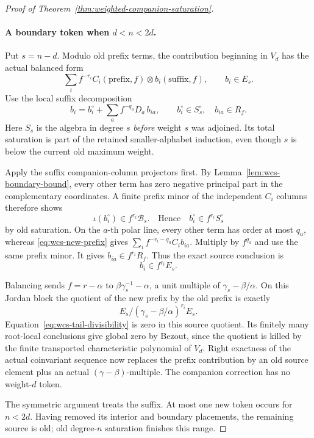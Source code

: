 \begin{proof}[Proof of Theorem~\ref{thm:weighted-companion-saturation}]
\paragraph{A boundary token when \(d<n<2d\).}
Put \(s=n-d\).  Modulo old prefix terms, the contribution
beginning in \(V_d\) has the actual balanced form
\begin{equation}\label{eq:wcs-new-prefix}
 \sum_i f^{-r_i}C_i(\text{prefix},f)
                       \otimes b_i(\text{suffix},f),
 \qquad b_i\in E_s .
\end{equation}
Use the local suffix decomposition
\[
 b_i=b_i^\circ+\sum_a f^{-q_a}D_a\,b_{ia},
 \qquad b_i^\circ\in S_s^\circ,\quad b_{ia}\in R_f.
\]
Here \(S_s\) is the algebra in degree \(s\) \emph{before}
weight \(s\) was adjoined.  Its total saturation is part of
the retained smaller-alphabet induction, even though
\(s\) is below the current old maximum weight.

Apply the suffix companion-column projectors first.
By Lemma~\ref{lem:wcs-boundary-bound}, every other term
has zero negative principal part in the complementary
coordinates.  A finite prefix minor of the independent
\(C_i\) columns therefore shows
\[
 \iota(b_i^\circ)\in f^{r_i}\mathcal B_s.
 \quad\text{Hence}\quad b_i^\circ\in f^{r_i}S_s^\circ
\]
by old saturation.  On the \(a\)-th polar line, every
other term has order at most \(q_a\), whereas
\eqref{eq:wcs-new-prefix} gives
\(\sum_i f^{-r_i-q_a}C_i b_{ia}\).  Multiply by \(f^{q_a}\)
and use the same prefix minor.  It gives
\(b_{ia}\in f^{r_i}R_f\).  Thus the exact source conclusion is
\begin{equation}\label{eq:wcs-tail-divisibility}
                         b_i\in f^{r_i}E_s .
\end{equation}

Balancing sends \(f=r-\alpha\) to
\(\beta\gamma_s^{-1}-\alpha\), a unit multiple of
\(\gamma_s-\beta/\alpha\).  On this Jordan block the
quotient of the new prefix by the old prefix is exactly
\[
 E_s/(\gamma_s-\beta/\alpha)^{r_i}E_s .
 \]
Equation~\eqref{eq:wcs-tail-divisibility} is zero in this
source quotient.  Its finitely many root-local conclusions
give global zero by Bezout, since the quotient is killed by
the finite transported characteristic polynomial of \(V_d\).
Right exactness of the actual coinvariant sequence now
replaces the prefix contribution by an old source element
plus an actual \((\gamma-\beta)\)-multiple.  The companion
correction has no weight-\(d\) token.

The symmetric argument treats the suffix.  At most one
new token occurs for \(n<2d\).  Having removed its interior
and boundary placements, the remaining source is old;
old degree-\(n\) saturation finishes this range.


\end{proof}

